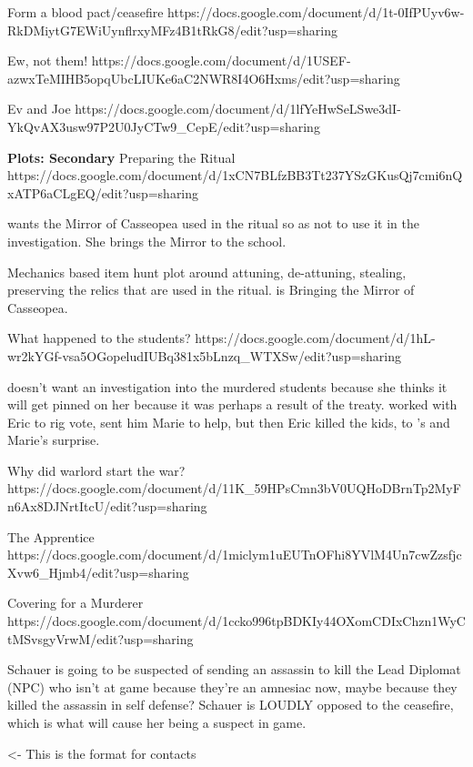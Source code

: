 \documentclass[char]{GL2020}
\begin{document}
Form a blood pact/ceasefire
https://docs.google.com/document/d/1t-0IfPUyv6w-RkDMiytG7EWiUynflrxyMFz4B1tRkG8/edit?usp=sharing

Ew, not them!
https://docs.google.com/document/d/1USEF-azwxTeMIHB5opqUbcLIUKe6aC2NWR8I4O6Hxms/edit?usp=sharing

Ev and Joe
https://docs.google.com/document/d/1lfYeHwSeLSwe3dI-YkQvAX3usw97P2U0JyCTw9_CepE/edit?usp=sharing

\textbf{Plots: Secondary}
Preparing the Ritual
https://docs.google.com/document/d/1xCN7BLfzBB3Tt237YSzGKusQj7cmi6nQxATP6aCLgEQ/edit?usp=sharing

\cDiplomat{} wants the Mirror of Casseopea used in the ritual so as not to use it in the investigation.  She brings the Mirror to the school.

Mechanics based item hunt plot around attuning, de-attuning, stealing, preserving the relics that are used in the ritual. \cDiplomat{} is Bringing the Mirror of Casseopea.

What happened to the students?
https://docs.google.com/document/d/1hL-wr2kYGf-vsa5OGopeludIUBq381x5bLnzq_WTXSw/edit?usp=sharing

\cDiplomat{} doesn't want an investigation into the murdered students because she thinks it will get pinned on her because it was perhaps a result of the treaty.  \cDiplomat{} worked with Eric to rig vote, sent him Marie to help, but then Eric killed the kids, to \cDiplomat{}'s and Marie's surprise.

Why did warlord start the war?
https://docs.google.com/document/d/11K_59HPsCmn3bV0UQHoDBrnTp2MyFn6Ax8DJNrtItcU/edit?usp=sharing

The Apprentice
https://docs.google.com/document/d/1miclym1uEUTnOFhi8YVlM4Un7cwZzsfjcXvw6_Hjmb4/edit?usp=sharing

Covering for a Murderer
https://docs.google.com/document/d/1ccko996tpBDKIy44OXomCDIxChzn1WyCtMSvsgyVrwM/edit?usp=sharing

Schauer is going to be suspected of sending an assassin to kill the Lead Diplomat (NPC) who isn't at game because they're an amnesiac now, maybe because they killed the assassin in self defense?  Schauer is LOUDLY opposed to the ceasefire, which is what will cause her being a suspect in game.

\begin{itemz}[Goals]
	\item 
\end{itemz}

\begin{itemz}[Notes]
	\item 
\end{itemz}

\begin{contacts}
	\contact{\cTest{}} <- This is the format for contacts 
\end{contacts}
\end{document}
